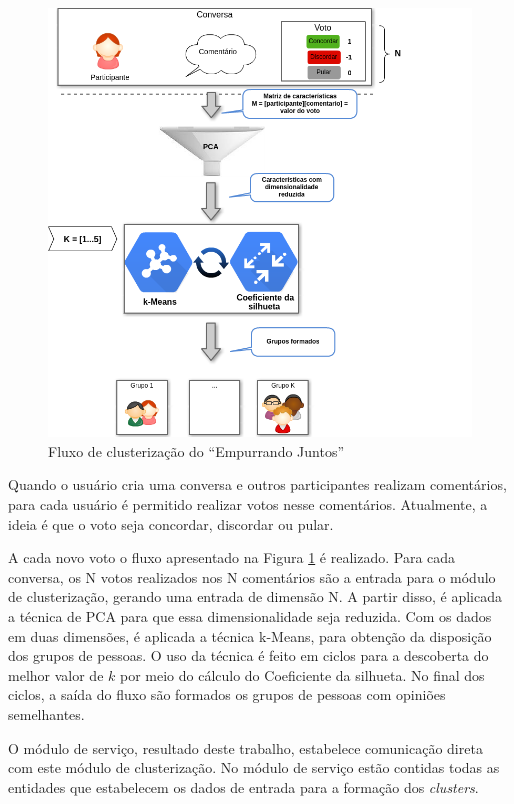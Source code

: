 \begin{figure}[h!]
\centering
\includegraphics[scale=0.7]{figuras/resumo_clusterizao_ej.png}
\caption{Fluxo de clusterização do ``Empurrando Juntos''}
\label{fig:resumo_clusterizao_ej}
\end{figure}

Quando o usuário cria uma conversa e outros participantes realizam comentários, para cada usuário é permitido realizar votos nesse comentários.
Atualmente, a ideia é que o voto seja concordar, discordar ou pular. 

\vfill 
\pagebreak
A cada novo voto o fluxo apresentado na Figura \ref{fig:resumo_clusterizao_ej} é
realizado. Para cada conversa, os N votos realizados nos N comentários são a entrada para o módulo de clusterização, 
gerando uma entrada de dimensão N. A partir disso, é aplicada a técnica de PCA para que
essa dimensionalidade seja reduzida. Com os dados em duas dimensões, é aplicada
a técnica k-Means, para obtenção da disposição dos grupos de pessoas. O uso da técnica é
feito em ciclos para a descoberta do melhor valor de $k$ por meio do cálculo do Coeficiente da silhueta.
No final dos ciclos, a saída do fluxo são formados os grupos de pessoas com opiniões semelhantes.

O módulo de serviço, resultado deste trabalho, estabelece comunicação direta com este módulo de clusterização. 
No módulo de serviço estão contidas todas as entidades que estabelecem os dados de entrada para a formação dos \textit{clusters}.





